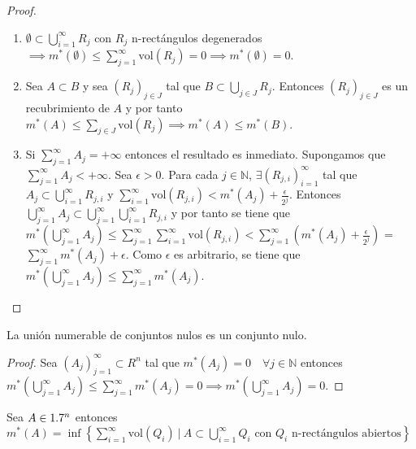 \begin{proof}
    \leavevmode
    \begin{enumerate}
        \item $\emptyset \subset \bigcup_{i=1}^\infty R_j$ con $R_j$ n-rectángulos degenerados $\implies m^*(\emptyset) \leq \sum_{j=1}^\infty \text{vol}(R_j) = 0 \implies m^*(\emptyset) = 0$.
        \item Sea $A \subset B$ y sea $(R_j)_{j \in J}$ tal que $B \subset \bigcup_{j \in J}
                  R_j$. Entonces $(R_j)_{j \in J}$ es un recubrimiento de $A$ y por tanto $m^*(A)
                  \leq \sum_{j \in J} \text{vol}(R_j) \implies m^*(A) \leq m^*(B)$.
        \item Si $\sum_{j=1}^{\infty}{A_j} = +\infty$ entonces el resultado es inmediato.
              Supongamos que $\sum_{j=1}^{\infty}{A_j} < +\infty$. Sea $\epsilon > 0$. Para
              cada $j \in \mathbb{N}$, $\exists (R_{j,i})_{i = 1}^\infty$ tal que $A_j
                  \subset \bigcup_{i = 1}^\infty R_{j,i}$ y $\sum_{i = 1}^\infty
                  \text{vol}(R_{j,i}) < m^*(A_j) + \frac{\epsilon}{2^j}$. Entonces
              $\bigcup_{j=1}^{\infty} A_j \subset \bigcup_{j=1}^{\infty} \bigcup_{i =
                      1}^\infty R_{j,i}$ y por tanto se tiene que $m^*(\bigcup_{j=1}^{\infty} A_j)
                  \leq \sum_{j=1}^{\infty} \sum_{i = 1}^\infty \text{vol}(R_{j,i}) <
                  \sum_{j=1}^{\infty} (m^*(A_j) + \frac{\epsilon}{2^j})$ = $\sum_{j=1}^{\infty}
                  m^*(A_j) + \epsilon$. Como $\epsilon$ es arbitrario, se tiene que
              $m^*(\bigcup_{j=1}^{\infty} A_j) \leq \sum_{j=1}^{\infty} m^*(A_j)$.
    \end{enumerate}
\end{proof}

\begin{corolario}
    La unión numerable de conjuntos nulos es un conjunto nulo.
\end{corolario}

\begin{proof}
    Sea $(A_j)_{j=1}^\infty \subset R^n$ tal que $m^*(A_j) = 0 \quad \forall j \in \mathbb{N}$ entonces $m^*(\bigcup_{j=1}^\infty A_j) \leq \sum_{j=1}^\infty m^*(A_j) = 0 \implies m^*(\bigcup_{j=1}^\infty A_j) = 0$.
\end{proof}

\begin{lema}
    Sea $A \in 1.7^n$ entonces $m^*(A) = \inf \left\{ \sum_{i=1}^\infty \text{vol}(Q_i) \ | \ A \subset \bigcup_{i=1}^\infty Q_i \text{ con } Q_i \text{ n-rectángulos abiertos} \right\}$
\end{lema}

